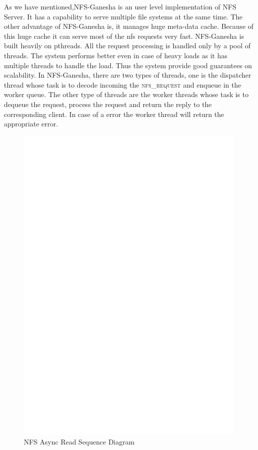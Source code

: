    As we have mentioned,NFS-Ganesha is an user level implementation of NFS Server. It has a capability to serve multiple file systems at the same time. The other advantage of NFS-Ganesha is, it manages huge meta-data cache. Because of this huge cache it can serve most of the nfs requests very fast. NFS-Ganesha is built heavily on pthreads.
All the request processing is handled only by a pool of threads. The system performs better even in case of heavy loads as it has multiple threads to handle the load. Thus the system provide good guarantees on scalability. In NFS-Ganesha, there are two types of threads, one is the dispatcher thread whose task is to decode incoming the \textsc{nfs\_request} and enqueue in the worker queue. The other type of threads are the worker threads whose task is to dequeue the request, process the request and return the reply to the corresponding client. In case of a error the worker thread will return the appropriate error.

\begin{figure}
\centering
\includegraphics[scale=0.75]{figures/AsyncSequence.eps}
\caption{NFS Async Read Sequence Diagram}
\label{fig:NFSAsyncRead}
\end{figure}


